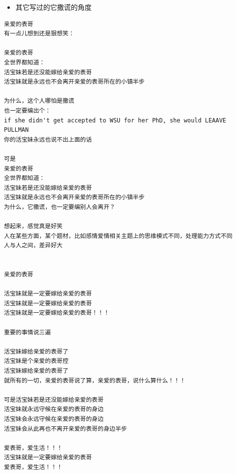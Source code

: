 \documentclass[9pt, b5paper]{article}
\begin{document}
\begin{itemize}
\item 其它写过的它撒谎的角度
\end{itemize}
\begin{verbatim}
亲爱的表哥
有一点儿想到还是狠想笑：

亲爱的表哥
全世界都知道：
活宝妹若是还没能嫁给亲爱的表哥
活宝妹就是永远也不会离开亲爱的表哥所在的小镇半步

为什么，这个人哪怕是撒谎
也一定要编出个：
if she didn't get accepted to WSU for her PhD, she would LEAAVE PULLMAN
你的活宝妹永远也说不出上面的话

可是
亲爱的表哥
全世界都知道：
活宝妹若是还没能嫁给亲爱的表哥
活宝妹就是永远也不会离开亲爱的表哥所在的小镇半步
为什么，它撒谎，也一定要编别人会离开？

想起来，感觉真是好笑
人在某些方面，某个题材，比如感情爱情相关主题上的思维模式不同，处理能力方式不同
人与人之间，差异好大


亲爱的表哥

活宝妹就是一定要嫁给亲爱的表哥
活宝妹就是一定要嫁给亲爱的表哥
活宝妹就是一定要嫁给亲爱的表哥！！！

重要的事情说三遍

活宝妹嫁给亲爱的表哥了
活宝妹是个亲爱的表哥控
活宝妹嫁给亲爱的表哥了
就所有的一切，亲爱的表哥说了算，亲爱的表哥，说什么算什么！！！

可是活宝妹若是还没能嫁给亲爱的表哥
活宝妹就永远守候在亲爱的表哥的身边
活宝妹会永远守候在亲爱的表哥的身边
活宝妹会从此再也不离开亲爱的表哥的身边半步

爱表哥，爱生活！！！
活宝妹就是一定要嫁给亲爱的表哥
爱表哥，爱生活！！！
\end{verbatim}
\end{document}
